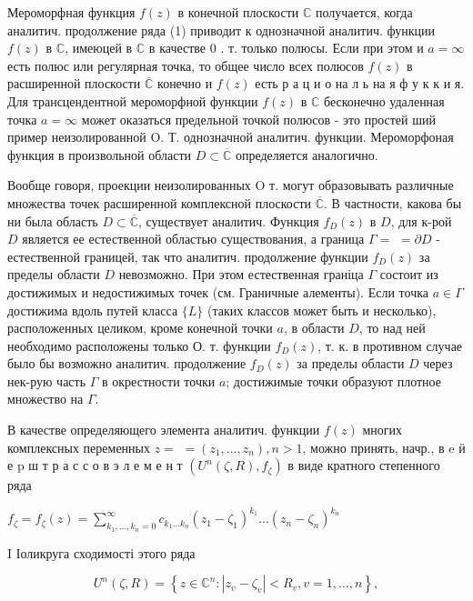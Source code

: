 \documentclass[10pt]{article}
\begin{document}
Мероморфная функция $f(z)$ в конечной плоскости $\mathbb{C}$ получается, когда аналитич. продолжение ряда (1) приводит к однозначной аналитич. функции $f(z)$ в $\mathbb{C}$, имеюцей в $\mathbb{C}$ в качестве 0 . т. только полюсы. Если при этом и $a=\infty$ есть полюс или регулярная точка, то общее число всех полюсов $f(z)$ в расширенной плоскости $\overline{\mathbb{C}}$ конечно и $f(z)$ есть р а ц и о на л ь на я ф у к к и я. Для трансцендентной мероморфной функции $f(z)$ в $\mathbb{C}$ бесконечно удаленная точка $a=\infty$ может оказаться предельной точкой полюсов - это простей ший пример неизолированной $\mathrm{O}$. Т. однозначной аналитич. функции. Мероморфоная функция в произвольной области $D \subset \overline{\mathbb{C}}$ определяется аналогично.



Вообще говоря, проекции неизолированных $\mathrm{O}$ т. могут образовывать различные множества точек расширенной комплексной плоскости $\overline{\mathbb{C}}$. В частности, какова бы ни была область $D \subset \overline{\mathbb{C}}$, существует аналитич. Функция $f_{D}(z)$ в $D$, для к-рой $D$ является ее естественной областью существования, а граница $\Gamma=$ $=\partial D$ - естественной границей, так что аналитич. продолжение функции $f_{D}(z)$ за пределы области $D$ невозможно. При этом естественная граніца $\Gamma$ состоит из достижимых и недостижимых точек (см. Граничные алементы). Если точка $a \in \Gamma$ достижима вдоль путей класса $\{L\}$ (таких классов может быть и несколько), расположенных целиком, кроме конечной точки $a$, в области $D$, то над ней необходимо расположены только О. т. функции $f_{D}(z)$, т. к. в противном случае было бы возможно аналитич. продолжение $f_{D}(z)$ за пределы области $D$ через нек-рую часть $\Gamma$ в окрестности точки $a$; достижимые точки образуют плотное множество на $\Gamma$.



В качестве определяющего элемента аналитич. функции $f(z)$ многих комплексных переменных $z=$ $=\left(z_{1}, \ldots, z_{n}\right), n>1$, можно принять, начр., в $\mathrm{e}$ ӥ е $\mathrm{p}$ ш т р а с с о в э л е м е н т $\left(U^{n}(\zeta, R), f_{\zeta}\right)$ в виде кратного степенного ряда



$f_{\zeta}=f_{\zeta}(z)=\sum_{k_{1}, \ldots, k_{n}=0}^{\infty} c_{k_{1} \ldots k_{n}}\left(z_{1}-\zeta_{1}\right)^{k_{1}} \ldots\left(z_{n}-\zeta_{n}\right)^{k_{n}}$



I Іоликруга сходимості этого ряда



\[

U^{n}(\zeta, R)=\left\{z \in \mathbb{C}^{n}:\left|z_{v}-\zeta_{v}\right|<R_{v}, v=1, \ldots, n\right\},

\]
\end{document}
